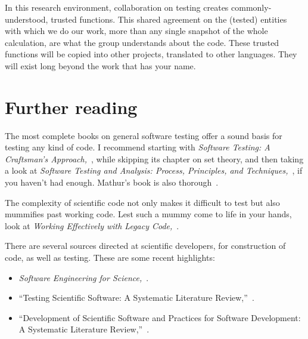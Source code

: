 \documentclass[fleqn,10pt]{olplainarticle}
\begin{document}
In this research environment, collaboration on testing
creates commonly-understood, trusted functions. This shared
agreement on the (tested) entities with which we do our work, more
than any single snapshot of the whole calculation, are
what the group understands about the code. These trusted
functions will be copied into other projects, translated
to other languages. They will exist long beyond the work
that has your name.

\section{Further reading}\label{sec:further-reading}

The most complete books on general software testing offer a sound
basis for testing any kind of code. I recommend starting with
\emph{Software Testing: A Craftsman's Approach,}~\citep{jorgensen2013},
while skipping its chapter on set theory, and then taking a look at
\emph{Software Testing and Analysis: Process, Principles, and Techniques,}~\citep{pezze2008},
if you haven't had enough. Mathur's book is also thorough~\citep{mathur2013}.

The complexity of scientific code not only makes it difficult
to test but also mummifies past working code. Lest such a mummy
come to life in your hands, look at \emph{Working Effectively with Legacy Code,}~\citep{feathers2004working}.

There are several sources directed at scientific developers, for
construction of code, as well as testing. These are some recent highlights:
\begin{itemize}
	\item \emph{Software Engineering for Science,}~\cite{carver2017}.
	\item ``Testing Scientific Software: A Systematic Literature Review,''~\cite{kanewala2014}.
	\item ``Development of Scientific Software and Practices for Software Development: A Systematic Literature Review,''~\cite{neumann2016}.
\end{itemize}




\printindex
\end{document}
